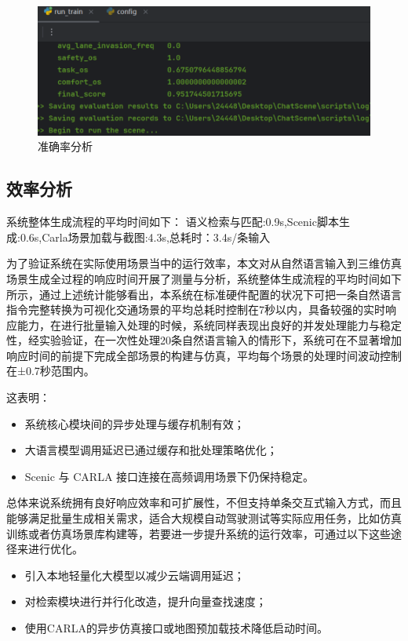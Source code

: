 \begin{figure}[h]
	\centering
	\includegraphics[width=1.0\textwidth]{"images/result1.pdf"}
	\caption{准确率分析}
	\label{fig:accuracy_analysis}
\end{figure}

\subsection{效率分析}
系统整体生成流程的平均时间如下：
语义检索与匹配:0.9s,Scenic脚本生成:0.6s,Carla场景加载与截图:4.3s,总耗时：3.4s/条输入

为了验证系统在实际使用场景当中的运行效率，本文对从自然语言输入到三维仿真场景生成全过程的响应时间开展了测量与分析，系统整体生成流程的平均时间如下所示，通过上述统计能够看出，本系统在标准硬件配置的状况下可把一条自然语言指令完整转换为可视化交通场景的平均总耗时控制在7秒以内，具备较强的实时响应能力，在进行批量输入处理的时候，系统同样表现出良好的并发处理能力与稳定性，经实验验证，在一次性处理20条自然语言输入的情形下，系统可在不显著增加响应时间的前提下完成全部场景的构建与仿真，平均每个场景的处理时间波动控制在±0.7秒范围内。

这表明：
\begin{itemize}
	\item 系统核心模块间的异步处理与缓存机制有效；
	\item 大语言模型调用延迟已通过缓存和批处理策略优化；
	\item Scenic 与 CARLA 接口连接在高频调用场景下仍保持稳定。
\end{itemize}

总体来说系统拥有良好响应效率和可扩展性，不但支持单条交互式输入方式，而且能够满足批量生成相关需求，适合大规模自动驾驶测试等实际应用任务，比如仿真训练或者仿真场景库构建等，若要进一步提升系统的运行效率，可通过以下这些途径来进行优化。
\begin{itemize}
	\item 引入本地轻量化大模型以减少云端调用延迟；
	\item 对检索模块进行并行化改造，提升向量查找速度；
	\item 使用CARLA的异步仿真接口或地图预加载技术降低启动时间。
\end{itemize}
